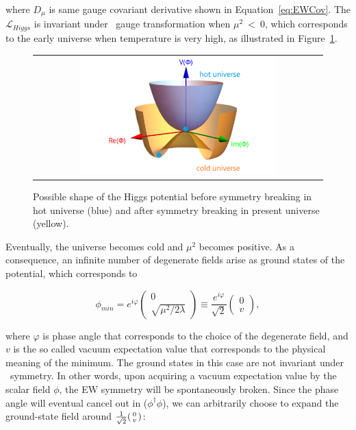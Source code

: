 where $D_{\mu}$ is same gauge covariant derivative shown in Equation~\ref{eq:EWCov}. The $\mathcal{L}_{Higgs}$ is invariant under \ew~gauge transformation when $\mu^2~<~0$, which corresponds to the early universe when temperature is very high, as illustrated in Figure~\ref{fig:HiggsPotential}. 

\begin{figure}[tbh!]
 \begin{center}
 \begin{tabular}{c}
 \includegraphics[width=0.7\textwidth]{figures/Part1/SM/HiggsPotential}
 \end{tabular}
 \caption{Possible shape of the Higgs potential before symmetry breaking in hot universe (blue) and after symmetry breaking in present universe (yellow).~\cite{universe9040178}}
 \label{fig:HiggsPotential}
 \end{center}
\end{figure}

Eventually, the universe becomes cold and $\mu^2$ becomes positive. As a consequence, an infinite number of degenerate fields arise as ground states of the potential, which corresponds to 

\begin{equation}
\phi_{min}=e^{i\varphi}\begin{pmatrix}0\\\sqrt{\mu^2/2\lambda}\end{pmatrix}\equiv\frac{e^{i\varphi}}{\sqrt{2}}\begin{pmatrix}0\\v\end{pmatrix},
\end{equation}

where $\varphi$ is phase angle that corresponds to the choice of the degenerate field, and $v$ is the so called vacuum expectation value that corresponds to the physical meaning of the minimum. The ground states in this case are not invariant under \ew~symmetry. In other words, upon acquiring a vacuum expectation value by the scalar field $\phi$, the \ac{EW} symmetry will be spontaneously broken. Since the phase angle will eventual cancel out in ($\phi^{\dagger}\phi$), we can arbitrarily choose to expand the ground-state field around $\frac{1}{\sqrt{2}}\begin{psmallmatrix}0\\v\end{psmallmatrix}$:

